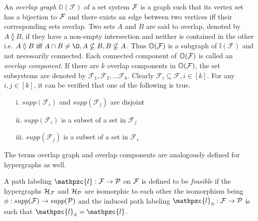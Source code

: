 \documentclass{llncs}
\def\cF{{\cal F}}
\def\cH{{\cal H}}
\def\cP{{\cal P}}
\def\F{{\mathcal F}}
\def\A{{\mathcal A}}
\def\bI{\mathbb I}
\def\bO{\mathbb O}
\def\cl{\mathpzc{l}}
\def\overlap{\between}
\newcommand{\rcomment}[1]{}
\begin{document}
\noindent
An {\em overlap graph} $\bO(\F)$ of a set system $\cF$ is a graph such
that its vertex set has a bijection to $\cF$ and there exists an edge
between two vertices iff their corresponding sets overlap. Two sets
$A$ and $B$ are said to overlap, denoted by $A \overlap B$, if they
have a non-empty intersection and neither is contained in the other
i.e. $A \overlap B \text{ iff } A \cap B \ne \O, A \nsubseteq B, B
\nsubseteq A$. Thus $\bO(\cF)$ is a subgraph of $\bI(\F)$ and not
necessarily connected. Each connected component of $\bO(\cF)$ is
called an {\em overlap component}. If there are $k$ overlap components
in $\bO(\cF)$, the set subsystems are denoted by $\F_1, \F_2, \ldots
\F_k$. Clearly $\F_i \subseteq \F, i \in [k]$. For any $i, j \in [k]$,
it can be verified that one of the following is true.
\begin{enumerate}
\item[i.] $supp(\F_i)$ and $supp(\F_j)$ are disjoint
\item[ii.] $supp(\F_i)$ is a subset of a set in $\F_j$
\item[iii.] $supp(\F_j)$ is a subset of a set in $\F_i$\\
\end{enumerate}
 

\rcomment
{CHANGE the above for hypergraphs instead of set systems?}

The terms overlap graph and overlap components are analogously defined for
hypergraphs as well. 






\noindent
A path labeling $\cl: \cF \rightarrow \cP$ on $\cF$ is defined to be {\em
  feasible} if the hypergraphs $\cH_\cF$ and $\cH_\cP$ are isomorphic
to each other the isomorphism being $\phi: supp(\cF)
\rightarrow supp(\cP)$ and the induced path labeling $\cl_\phi: \cF
\rightarrow \cP$ is
such that $\cl_\phi = \cl$. 
\end{document}
